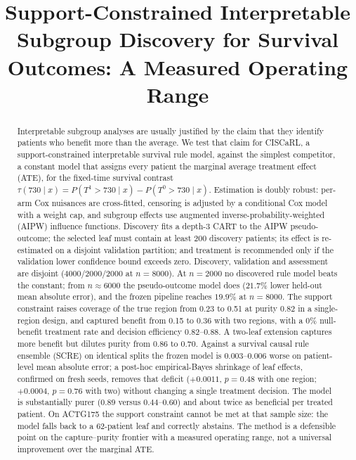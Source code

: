 \documentclass[conference]{IEEEtran}
\begin{document}
\title{Support-Constrained Interpretable Subgroup Discovery for Survival
Outcomes: A Measured Operating Range}

\author{
}

\maketitle

\begin{abstract}
Interpretable subgroup analyses are usually justified by the claim that they
identify patients who benefit more than the average. We test that claim for
CISCaRL, a support-constrained interpretable survival rule model, against the
simplest competitor, a constant model that assigns every patient the marginal
average treatment effect (ATE), for the fixed-time survival contrast
$\tau(730\mid x)=P(T^{1}>730\mid x)-P(T^{0}>730\mid x)$. Estimation is doubly
robust: per-arm Cox nuisances are cross-fitted, censoring is adjusted by a
conditional Cox model with a weight cap, and subgroup effects use augmented
inverse-probability-weighted (AIPW) influence functions. Discovery fits a
depth-3 CART to the AIPW pseudo-outcome; the selected leaf must contain at
least 200 discovery patients; its effect is re-estimated on a disjoint
validation partition; and treatment is recommended only if the validation
lower confidence bound exceeds zero. Discovery, validation and assessment are
disjoint (4000/2000/2000 at $n=8000$). At $n=2000$ no discovered rule model
beats the constant; from $n\approx6000$ the pseudo-outcome model does
($21.7\%$ lower held-out mean absolute error), and the frozen pipeline reaches
$19.9\%$ at $n=8000$. The support constraint raises coverage of the true region
from 0.23 to 0.51 at purity $0.82$ in a single-region design, and captured
benefit from 0.15 to 0.36 with two regions, with a $0\%$ null-benefit
treatment rate and decision efficiency $0.82$--$0.88$. A two-leaf extension captures more benefit but dilutes purity
from 0.86 to 0.70. Against a survival causal rule ensemble (SCRE) on identical
splits the frozen model is $0.003$--$0.006$ worse on patient-level mean absolute
error; a post-hoc empirical-Bayes shrinkage of leaf effects, confirmed on fresh
seeds, removes that deficit ($+0.0011$, $p=0.48$ with one region; $+0.0004$,
$p=0.76$ with two) without changing a single treatment decision. The model is
substantially purer ($0.89$ versus $0.44$--$0.60$) and about twice as beneficial
per treated patient. On ACTG175 the support constraint cannot be met at that sample size:
the model falls back to a 62-patient leaf and correctly abstains. The method is
a defensible point on the capture--purity frontier with a measured operating
range, not a universal improvement over the marginal ATE.
\end{abstract}
\end{document}
